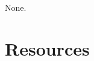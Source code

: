 None.

\section{Resources}

\renewcommand{\addcontentsline}[3]{}%



\begin{comment}
  
\section{Scalar quantization in the $\text{RGB}$ domain}

Supposing that we are using a dead-zone quantizer, a $\text{RGB}$
image can be quantized, channel by channel, using quantization steps
$\mathbf{\Delta}_{\text{R}}$, $\mathbf{\Delta}_{\text{G}}$, and
$\mathbf{\Delta}_{\text{B}}$ (being $\mathbf{\Delta}$ the
``quantization pattern''). A reasonable question that arises here is:
given a target bit-rate $R$ for the compressed frame, how the
quantization steps should be chosen to minimize the distortion?

At this point we can consider two different quantization
perspectives. In the first one, if we consider a strictly visual
effect, any alternative different from
\begin{equation}
  \mathbf{\Delta}_{\text{R}} = \mathbf{\Delta}_{\text{G}} = \mathbf{\Delta}_{\text{B}}
  \label{eq:simple_Q}
\end{equation}
will produce some alteration in the color (also called the
\href{https://en.wikipedia.org/wiki/Chrominance}{``chroma''}) of the
reconstructed image.

A second perspective considers only a pure
\href{https://en.wikipedia.org/wiki/Rate-distortion_theory}{Rate/Distortion
  (RD) performance}~\cite{vruiz__information_theory}. The $\text{RGB}$
color domain is additive, which means that the distortion generated in
the quantized image is the sum of the distortions generated in each of
the channels, when they are quantized independently. Therefore, the
optimal RD curve for the reconstructed image (using the $3$ channels)
can be obtained through the steps:
\begin{enumerate}
\item Compute the RD curve for each channel. Notice that here we must
  define a set of quantization steps for each channel. For simplicity,
  use the same set for the three channels.
\item Put all the RD points in a list and sort the list by the slopes
  of the points. Since the points have been ordered by their slope,
  the sequence of quantization patterns should generate the optimal
  curve.
\item Use the corresponding quantization patterns (defined by the points
  of the list) to compute the RD curve of the reconstructed image.
\end{enumerate}


\end{comment}
